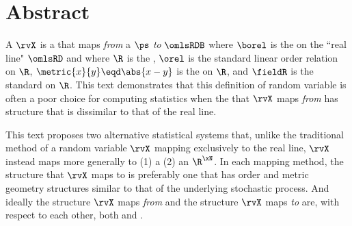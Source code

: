 \section*{Abstract}
A  $\rvX$ is a   
that maps \emph{from} a  $\ps$
\emph{to} $\omlsRDB$ where $\borel$ is the 
on the ``real line" $\omlsRD$ and 
where $\R$ is the ,
$\orel$ is the standard linear order relation on $\R$, $\metric{x}{y}\eqd\abs{x-y}$ is the 
 on $\R$, and $\fieldR$ is the standard  on $\R$.
This text demonstrates that this definition of random variable is   %
often a poor choice for computing statistics
when the  that $\rvX$ maps \emph{from} has structure that is dissimilar to that of the real line. %

This text proposes two alternative statistical systems that, unlike the traditional method of 
a random variable $\rvX$ mapping exclusively to the real line,
$\rvX$ instead maps more generally to (1) a  
(2) an  $\R^\xN$.
In each mapping method, the structure that $\rvX$ maps to  
is preferably one
that has order and metric geometry structures similar to that of the underlying stochastic process.
And ideally the structure $\rvX$ maps \emph{from} and the 
structure $\rvX$ maps \emph{to} are, with respect to each other, 
both  and .


%

